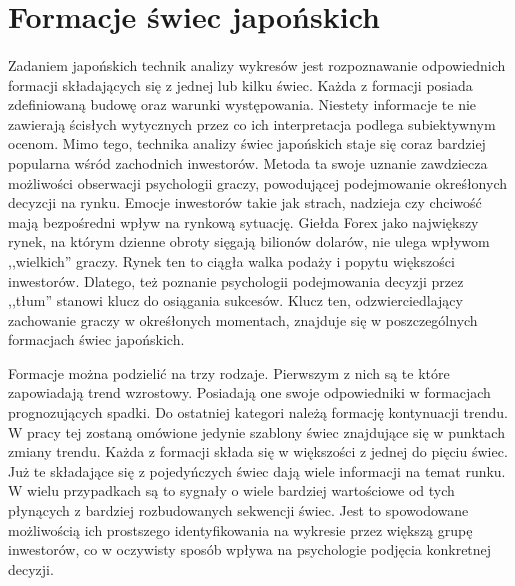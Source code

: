 \documentclass[pdflatex,11pt]{aghdpl}
\begin{document}
\section{Formacje świec japońskich}
\label{swiece_rozdzial}
\paragraph{}
Zadaniem japońskich technik analizy wykresów jest rozpoznawanie odpowiednich formacji składających się z jednej lub kilku świec. Każda z formacji posiada zdefiniowaną budowę oraz warunki występowania. Niestety informacje te nie zawierają ścisłych wytycznych przez co ich interpretacja podlega subiektywnym ocenom. Mimo tego, technika analizy świec japońskich staje się coraz bardziej popularna wśród zachodnich inwestorów. Metoda ta swoje uznanie zawdziecza możliwości obserwacji psychologii graczy, powodującej podejmowanie okreśłonych decyzcji na rynku. Emocje inwestorów takie jak strach, nadzieja czy chciwość mają bezpośredni wpływ na rynkową sytuację. Giełda Forex jako największy rynek, na którym dzienne obroty sięgają bilionów dolarów, nie ulega wpływom ,,wielkich'' graczy. Rynek ten to ciągła walka podaży i popytu większości inwestorów. Dlatego, też poznanie psychologii podejmowania decyzji przez ,,tłum'' stanowi klucz do osiągania sukcesów. Klucz ten, odzwierciedlający zachowanie graczy w okreśłonych momentach, znajduje się w poszczególnych formacjach świec japońskich. 

Formacje można podzielić na trzy rodzaje. Pierwszym z nich są te które zapowiadają trend wzrostowy. Posiadają one swoje odpowiedniki w formacjach prognozujących spadki. Do ostatniej kategori należą formację kontynuacji trendu. W pracy tej zostaną omówione jedynie szablony świec znajdujące się w punktach zmiany trendu. Każda z formacji składa się w większości z jednej do pięciu świec. Już te składające się z pojedyńczych świec dają wiele informacji na temat runku. W wielu przypadkach są to sygnały o wiele bardziej wartościowe od tych płynących z bardziej rozbudowanych sekwencji świec. Jest to spowodowane możliwością ich prostszego identyfikowania na wykresie przez większą grupę inwestorów, co w oczywisty sposób wpływa na psychologie podjęcia konkretnej decyzji. 
\end{document}
